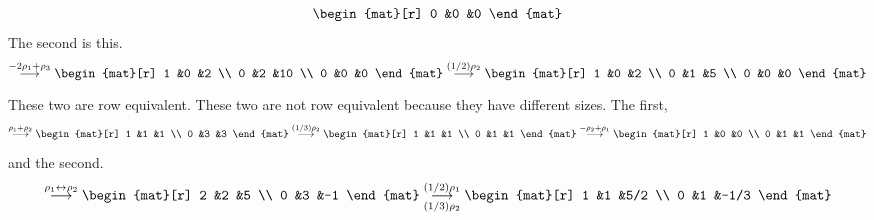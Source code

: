 \begin{exercises}
\begin{answer}
\begin{exparts}
\begin{equation*}
\begin{mat}[r]
              0  &0  &0
            \end{mat}
          \end{equation*}
          The second is this.
          \begin{equation*}
            \grstep{-2\rho_1+\rho_3}
            \begin{mat}[r]
              1  &0  &2  \\
              0  &2  &10 \\
              0  &0  &0
            \end{mat}
            \grstep{(1/2)\rho_2}
            \begin{mat}[r]
              1  &0  &2  \\
              0  &1  &5  \\
              0  &0  &0
            \end{mat}
          \end{equation*}
          These two are row equivalent.
        \partsitem These two are not row equivalent because they have different
          sizes.
        \partsitem The first,
          \begin{equation*}
            \grstep{\rho_1+\rho_2}
            \begin{mat}[r]
              1  &1  &1  \\
              0  &3  &3
            \end{mat}
            \grstep{(1/3)\rho_2}
            \begin{mat}[r]
              1  &1  &1  \\
              0  &1  &1
            \end{mat}
            \grstep{-\rho_2+\rho_1}
            \begin{mat}[r]
              1  &0  &0  \\
              0  &1  &1
            \end{mat}
          \end{equation*}
          and the second.
          \begin{equation*}
            \grstep{\rho_1\leftrightarrow\rho_2}
            \begin{mat}[r]
              2  &2  &5  \\
              0  &3  &-1
            \end{mat}
            \grstep[(1/3)\rho_2]{(1/2)\rho_1}
            \begin{mat}[r]
              1  &1  &5/2 \\
              0  &1  &-1/3

\end{mat}
\end{equation*}
\end{exparts}
\end{answer}
\end{exercises}
